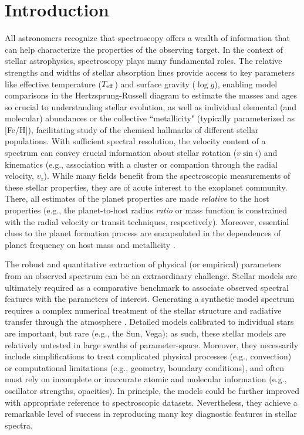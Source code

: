 \documentclass[iop,floatfix,numberedappendix,twocolappendix]{emulateapj}
\begin{document}
\section{Introduction} \label{sec:intro}

All astronomers recognize that spectroscopy offers a wealth of information that can help
characterize the properties of the observing target.  In the context of stellar astrophysics,
spectroscopy plays many fundamental roles.  The relative strengths and widths of stellar absorption
lines provide access to key parameters like effective temperature ($T_{\rm eff}$) and surface
gravity ($\log g$), enabling model comparisons in the Hertzsprung-Russell diagram to estimate the
masses and ages so crucial to understanding stellar evolution, as well as individual elemental (and
molecular) abundances or the collective ``metallicity" (typically parameterized as [Fe/H]),
facilitating study of the chemical hallmarks of different stellar populations.  With sufficient
spectral resolution, the velocity content of a spectrum can convey crucial information about stellar
rotation ($v \sin i$) and kinematics (e.g., association with a cluster or companion through the
radial velocity, $v_z$).  While many fields benefit from the spectroscopic measurements of these
stellar properties, they are of acute interest to the exoplanet community.  There, all estimates of
the planet properties are made {\it relative} to the host properties (e.g., the planet-to-host
radius {\it ratio} or mass function is constrained with the radial velocity or transit techniques,
respectively).  Moreover, essential clues to the planet formation process are encapsulated in the
dependences of planet frequency on host mass \citep[e.g.,][]{johnson07,howard10} and metallicity
\citep[e.g.,][]{fischer05,buchhave14}.   

The robust and quantitative extraction of physical (or empirical) parameters from an 
observed spectrum can be an extraordinary challenge.  Stellar models are ultimately required as a 
comparative benchmark to associate observed spectral features with the parameters of interest.  
Generating a synthetic model spectrum requires a complex numerical treatment of the stellar 
structure and radiative transfer through the atmosphere \citep[e.g.,][]{kurucz93,castelli04,
hauschildt99,husser13,paxton11}.  Detailed models calibrated to individual stars are important, but 
rare (e.g., the Sun, Vega); as such, these stellar models are relatively untested in large swaths 
of parameter-space.  Moreover, they necessarily include simplifications to treat complicated 
physical processes (e.g., convection) or computational limitations (e.g., geometry, boundary 
conditions), and often must rely on incomplete or inaccurate atomic and molecular information 
(e.g., oscillator strengths, opacities).  In principle, the models could be further improved with 
appropriate reference to spectroscopic datasets.  Nevertheless, they achieve a remarkable level of 
success in reproducing many key diagnostic features in stellar spectra.  
\end{document}
